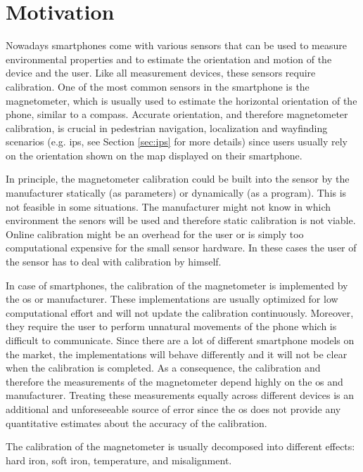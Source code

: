 
\section{Motivation}

Nowadays smartphones come with various sensors that can be used to measure environmental properties and to estimate the orientation and motion of the device and the user. Like all measurement devices, these sensors require calibration. One of the most common sensors in the smartphone is the magnetometer, which is usually used to estimate the horizontal orientation of the phone, similar to a compass. Accurate orientation, and therefore magnetometer calibration, is crucial in pedestrian navigation, localization and wayfinding scenarios (e.g. \gls{ips}, see Section \ref{sec:ips} for more details) since users usually rely on the orientation shown on the map displayed on their smartphone.

In principle, the magnetometer calibration could be built into the sensor by the manufacturer statically (as parameters) or dynamically (as a program). This is not feasible in some situations. The manufacturer might not know in which environment the senors will be used and therefore static calibration is not viable. Online calibration might be an overhead for the user or is simply too computational expensive for the small sensor hardware. In these cases the user of the sensor has to deal with calibration by himself.

In case of smartphones, the calibration of the magnetometer is implemented by the \gls{os} or manufacturer. These implementations are usually optimized for low computational effort and will not update the calibration continuously. Moreover, they require the user to perform unnatural movements of the phone which is difficult to communicate. Since there are a lot of different smartphone models on the market, the implementations will behave differently and it will not be clear when the calibration is completed. As a consequence, the calibration and therefore the measurements of the magnetometer depend highly on the \gls{os} and manufacturer. Treating these measurements equally across different devices is an additional and unforeseeable source of error since the \gls{os} does not provide any quantitative estimates about the accuracy of the calibration.

The calibration of the magnetometer is usually decomposed into different effects: hard iron, soft iron, temperature, and misalignment.

